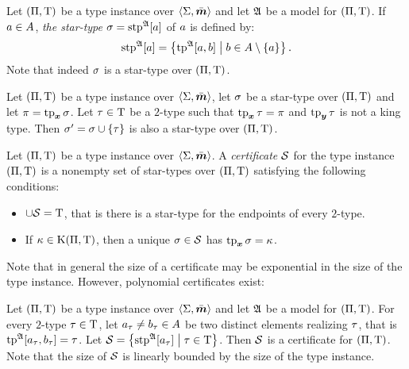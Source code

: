 \begin{definition}\label{def:stp-str}
Let $(\Pi,\mathrm{T})$ be a type instance over $\left\langle \mathrm{\Sigma},\bar{\bm{m}} \right\rangle$
and let $\mathfrak{A}$ be a model for $(\Pi,\mathrm{T})$.
If $a \in A$, \emph{the star-type} $\sigma = \operatorname{stp}^{\mathfrak{A}}[a]$ of $a$ is
defined by:
\[
  \operatorname{stp}^{\mathfrak{A}}[a] = \left\{\operatorname{tp}^{\mathfrak{A}}[a,b]\mathrel{}\middle|\mathrel{}b \in A \setminus \left\{a\right\}\right\}.
\]
Note that indeed $\sigma$ is a star-type over $(\Pi,\mathrm{T})$.
\end{definition}

\begin{remark}\label{rem:star-type-ext}
Let $(\Pi,\mathrm{T})$ be a type instance over $\left\langle \mathrm{\Sigma},\bar{\bm{m}} \right\rangle$,
let $\sigma$ be a star-type over $(\Pi,\mathrm{T})$ and let $\pi = \operatorname{tp}_{\bm{x}}\sigma$.
Let $\tau \in \mathrm{T}$ be a $2$-type such that $\operatorname{tp}_{\bm{x}}\tau = \pi$ and
$\operatorname{tp}_{\bm{y}}\tau$ is not a king type.
Then ${\sigma'} = \sigma \cup \left\{\tau\right\}$ is also a star-type over
$(\Pi,\mathrm{T})$.
\end{remark}

\begin{definition}
Let $(\Pi,\mathrm{T})$ be a type instance over $\left\langle \mathrm{\Sigma},\bar{\bm{m}} \right\rangle$.
A \emph{certificate} $\mathcal{S}$ for the type instance
$(\Pi,\mathrm{T})$ is a nonempty set of star-types over $(\Pi,\mathrm{T})$
satisfying the following conditions:
\begin{itemize}
  \item[\condcertT]\label{cond:certT}
  $\cup\mathcal{S} = \mathrm{T}$, that is there is a star-type for the endpoints of every
  $2$-type.
  \item[\condcertk]\label{cond:certk}
  If $\kappa \in \mathrm{K}(\Pi,\mathrm{T})$, then a unique $\sigma \in \mathcal{S}$ has $\operatorname{tp}_{\bm{x}}\sigma
  = \kappa$.
\end{itemize}
\end{definition}

Note that in general the size of a certificate may be exponential in
the size of the type instance. However, polynomial certificates exist:
\begin{lemma}\label{lem:cert-extract}
Let $(\Pi,\mathrm{T})$ be a type instance over $\left\langle \mathrm{\Sigma},\bar{\bm{m}} \right\rangle$ and let $\mathfrak{A}$
be a model for $(\Pi,\mathrm{T})$.
For every $2$-type $\tau \in \mathrm{T}$, let $a_{\tau} \neq b_{\tau} \in A$
be two distinct elements realizing $\tau$, that is
$\operatorname{tp}^{\mathfrak{A}}[a_{\tau},b_{\tau}] = \tau$.
Let $\mathcal{S} = \left\{\operatorname{stp}^{\mathfrak{A}}[a_{\tau}]\mathrel{}\middle|\mathrel{}\tau\in\mathrm{T}\right\}$.
Then $\mathcal{S}$ is a certificate for $(\Pi,\mathrm{T})$.
Note that the size of $\mathcal{S}$ is linearly bounded by the size of the type
instance.
\end{lemma}

